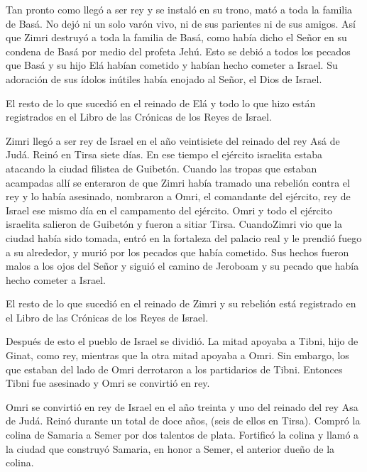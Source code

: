  Tan pronto como llegó a ser rey y se instaló en su trono,
mató a toda la familia de Basá. No dejó ni un solo varón vivo, ni de sus
parientes ni de sus amigos.  Así que Zimri destruyó a toda
la familia de Basá, como había dicho el Señor en su condena de Basá por
medio del profeta Jehú.  Esto se debió a todos los pecados
que Basá y su hijo Elá habían cometido y habían hecho cometer a Israel.
Su adoración de sus ídolos inútiles había enojado al Señor, el Dios de
Israel.

 El resto de lo que sucedió en el reinado de Elá y todo lo
que hizo están registrados en el Libro de las Crónicas de los Reyes de
Israel.

 Zimri llegó a ser rey de Israel en el año veintisiete del
reinado del rey Asá de Judá. Reinó en Tirsa siete días. En ese tiempo el
ejército israelita estaba atacando la ciudad filistea de Guibetón.
 Cuando las tropas que estaban acampadas allí se enteraron
de que Zimri había tramado una rebelión contra el rey y lo había
asesinado, nombraron a Omri, el comandante del ejército, rey de Israel
ese mismo día en el campamento del ejército.  Omri y todo
el ejército israelita salieron de Guibetón y fueron a sitiar Tirsa.
 CuandoZimri vio que la ciudad había sido tomada, entró en
la fortaleza del palacio real y le prendió fuego a su alrededor, y murió
por los pecados que había cometido.  Sus hechos fueron
malos a los ojos del Señor y siguió el camino de Jeroboam y su pecado
que había hecho cometer a Israel.

 El resto de lo que sucedió en el reinado de Zimri y su
rebelión está registrado en el Libro de las Crónicas de los Reyes de
Israel.

 Después de esto el pueblo de Israel se dividió. La mitad
apoyaba a Tibni, hijo de Ginat, como rey, mientras que la otra mitad
apoyaba a Omri.  Sin embargo, los que estaban del lado de
Omri derrotaron a los partidarios de Tibni. Entonces Tibni fue asesinado
y Omri se convirtió en rey.

 Omri se convirtió en rey de Israel en el año treinta y uno
del reinado del rey Asa de Judá. Reinó durante un total de doce años,
(seis de ellos en Tirsa).  Compró la colina de Samaria a
Semer por dos talentos de plata. Fortificó la colina y llamó a la ciudad
que construyó Samaria, en honor a Semer, el anterior dueño de la colina.

